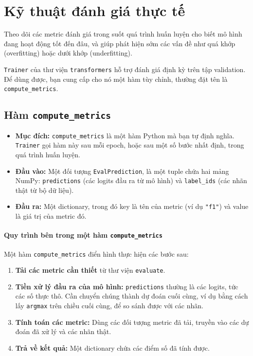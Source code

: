 
\section{Kỹ thuật đánh giá thực tế}
\label{sec:practical_evaluation}

Theo dõi các metric đánh giá trong suốt quá trình huấn luyện cho biết mô hình đang hoạt động tốt đến đâu, và giúp phát hiện sớm các vấn đề như quá khớp (overfitting) hoặc dưới khớp (underfitting).

\texttt{Trainer} của thư viện \texttt{transformers} hỗ trợ đánh giá định kỳ trên tập validation. Để dùng được, bạn cung cấp cho nó một hàm tùy chỉnh, thường đặt tên là \texttt{compute\_metrics}.

\subsection{Hàm \texttt{compute\_metrics}}
\label{ssec:compute_metrics_function}

\begin{itemize}
    \item \textbf{Mục đích:} \texttt{compute\_metrics} là một hàm Python mà bạn tự định nghĩa. \texttt{Trainer} gọi hàm này sau mỗi epoch, hoặc sau một số bước nhất định, trong quá trình huấn luyện.
    \item \textbf{Đầu vào:} Một đối tượng \texttt{EvalPrediction}, là một tuple chứa hai mảng NumPy: \texttt{predictions} (các logits đầu ra từ mô hình) và \texttt{label\_ids} (các nhãn thật từ bộ dữ liệu).
    \item \textbf{Đầu ra:} Một dictionary, trong đó key là tên của metric (ví dụ \texttt{"f1"}) và value là giá trị của metric đó.
\end{itemize}

\paragraph{Quy trình bên trong một hàm \texttt{compute\_metrics}}
Một hàm \texttt{compute\_metrics} điển hình thực hiện các bước sau:
\begin{enumerate}
    \item \textbf{Tải các metric cần thiết} từ thư viện \texttt{evaluate}.
    \item \textbf{Tiền xử lý đầu ra của mô hình:} \texttt{predictions} thường là các logits, tức các số thực thô. Cần chuyển chúng thành dự đoán cuối cùng, ví dụ bằng cách lấy \texttt{argmax} trên chiều cuối cùng, để so sánh được với các nhãn.
    \item \textbf{Tính toán các metric:} Dùng các đối tượng metric đã tải, truyền vào các dự đoán đã xử lý và các nhãn thật.
    \item \textbf{Trả về kết quả:} Một dictionary chứa các điểm số đã tính được.
\end{enumerate}

